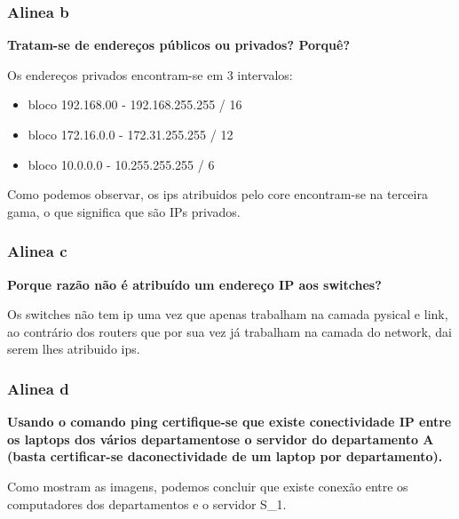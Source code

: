 \documentclass{article}
\begin{document}
\subsubsection{Alinea b}
\textbf{Tratam-se de endereços públicos ou privados? Porquê?}\\\par
Os endereços privados encontram-se em 3 intervalos:	
\begin{itemize}
	\item bloco 192.168.00 - 192.168.255.255 / 16
	\item bloco 172.16.0.0 - 172.31.255.255 / 12
	\item bloco 10.0.0.0 - 10.255.255.255 / 6
\end{itemize}\par
Como podemos observar, os ips atribuidos pelo core encontram-se na terceira gama, o que significa que são IPs privados.\\

\subsubsection{Alinea c}
\textbf{Porque razão não é atribuído um endereço IP aos switches?}\\\par
Os switches não tem ip uma vez que apenas trabalham na camada pysical e link, ao contrário dos routers que por sua vez já trabalham na camada do network, dai serem lhes atribuido ips. \\

\subsubsection{Alinea d}
\textbf{Usando o comando ping certifique-se que existe conectividade IP entre os laptops dos vários departamentose o servidor do departamento A (basta certificar-se   daconectividade de um laptop por departamento).}\\\par
Como mostram as imagens, podemos concluir que existe conexão entre os computadores dos departamentos e o servidor S_1.\\
\end{document}
